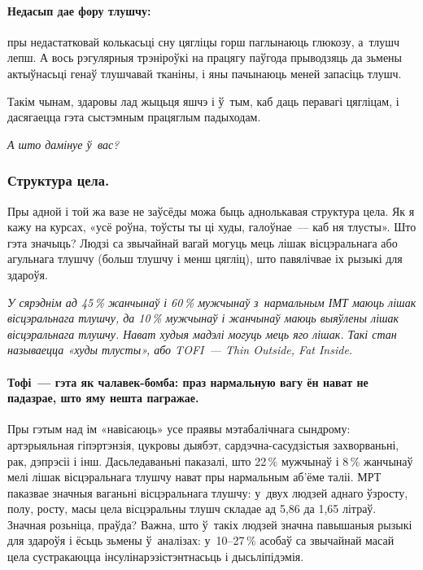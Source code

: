 \paragraph{Недасып дае фору тлушчу:} пры недастатковай колькасьці сну цягліцы горш паглынаюць глюкозу, а~тлушч лепш. А вось рэгулярныя трэніроўкі на працягу паўгода прыводзяць да зьмены актыўнасьці генаў тлушчавай тканіны, і яны пачынаюць меней запасіць тлушч. 

Такім чынам, здаровы лад жыцьця яшчэ і ў~тым, каб даць перавагі цягліцам, і дасягаецца гэта сыстэмным працяглым падыходам. 

\emph{А што дамінуе ў~вас?}

\subsubsection{Структура цела.} 
Пры адной і той жа вазе не заўсёды можа быць аднолькавая структура цела. Як я кажу на курсах, «усё роўна, тоўсты ты ці худы, галоўнае~--- каб ня тлусты». Што гэта значыць? Людзі са звычайнай вагай могуць мець лішак вісцэральнага або агульнага тлушчу (больш тлушчу і менш цягліц), што павялічвае іх рызыкі для здароўя.

\emph{У сярэднім ад 45\,\% жанчынаў і 60\,\% мужчынаў з~нармальным ІМТ маюць лішак вісцэральнага тлушчу, да 10\,\% мужчынаў і жанчынаў маюць выяўлены лішак вісцэральнага тлушчу. Нават худыя мадэлі могуць мець яго лішак. Такі стан называецца «худы тлусты», або TOFI~--- Thin Outside, Fat Inside.}

\paragraph{Тофі~--- гэта як чалавек-бомба: праз нармальную вагу ён нават не падазрае, што яму нешта пагражае.} Пры гэтым над ім «навісаюць» усе праявы мэтабалічнага сындрому: артэрыяльная гіпэртэнзія, цукровы дыябэт, сардэчна-сасудзістыя захворваньні, рак, дэпрэсіі і інш. Дасьледаваньні паказалі, што 22\,\% мужчынаў і 8\,\% жанчынаў мелі лішак вісцэральнага тлушчу нават пры нармальным аб'ёме таліі. МРТ паказвае значныя ваганьні вісцэральнага тлушчу: у~двух людзей аднаго ўзросту, полу, росту, масы цела вісцэральны тлушч складае ад 5,86 да 1,65 літраў. Значная розьніца, праўда? Важна, што ў~такіх людзей значна павышаныя рызыкі для здароўя і ёсьць зьмены ў~аналізах: у~10--27\,\% асобаў са звычайнай масай цела сустракаюцца інсулінарэзістэнтнасьць і дысьліпідэмія.

